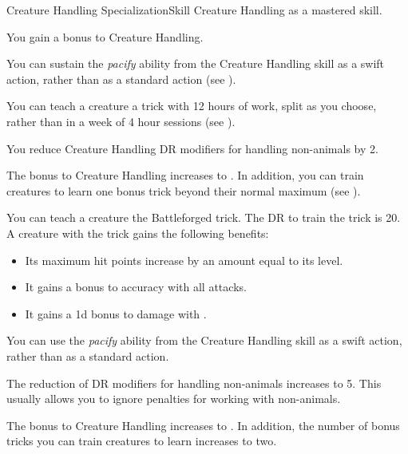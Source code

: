     \begin{feat}{Creature Handling Specialization}{Skill}
        \featpre Creature Handling as a mastered skill.
        \featben

         You gain a  bonus to Creature Handling.

         You can sustain the \textit{pacify} ability from the Creature Handling skill as a swift action, rather than as a standard action (see ).

         You can teach a creature a trick with 12 hours of work, split as you choose, rather than in a week of 4 hour sessions (see ).

         You reduce Creature Handling DR modifiers for handling non-animals by 2.

         The bonus to Creature Handling increases to .
        In addition, you can train creatures to learn one bonus trick beyond their normal maximum (see ).

         You can teach a creature the Battleforged trick.
        The DR to train the trick is 20.
        A creature with the trick gains the following benefits:
        \begin{itemize}
            \item Its maximum hit points increase by an amount equal to its level.
            \item It gains a  bonus to accuracy with all attacks.
            \item It gains a \plus1d bonus to damage with .
        \end{itemize}

         You can use the \textit{pacify} ability from the Creature Handling skill as a swift action, rather than as a standard action.

         The reduction of DR modifiers for handling non-animals increases to 5.
        This usually allows you to ignore penalties for working with non-animals.

         The bonus to Creature Handling increases to .
        In addition, the number of bonus tricks you can train creatures to learn increases to two.


\end{feat}
